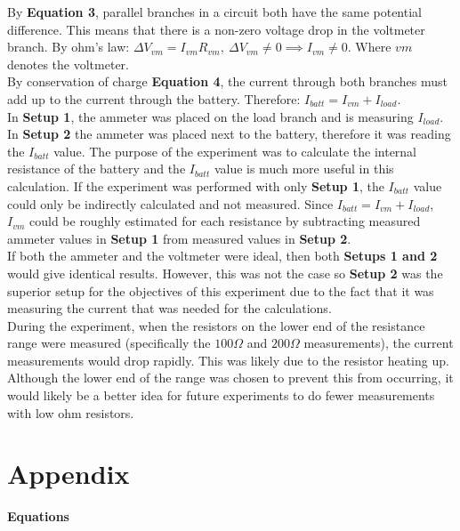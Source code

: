 \documentclass[
	letterpaper, %
	10pt, %
]{CSUniSchoolLabReport}
\begin{document}
By \textbf{Equation 3}, parallel branches in a circuit both have the same potential
difference. This means that there is a non-zero voltage drop in the voltmeter branch. By ohm's law:
$\Delta V_{vm} = I_{vm} R_{vm}, \ \Delta V_{vm} \ne 0 \implies I_{vm} \ne 0$. Where $vm$ denotes the voltmeter.\\

By conservation of charge \textbf{Equation 4}, the current through both branches must add up to the current through the battery. Therefore: $I_{batt} = I_{vm} + I_{load}$.\\

In \textbf{Setup 1}, the ammeter was placed on the load branch and is measuring $I_{load}$. In \textbf{Setup 2} the
ammeter was placed next to the battery, therefore it was reading the $I_{batt}$ value. The
purpose of the experiment was to calculate the internal resistance of the battery and the $I_{batt}$ value is much more useful in this
calculation. If the experiment was performed with only \textbf{Setup 1}, the $I_{batt}$ value could only be indirectly calculated and
not measured. Since $I_{batt} = I_{vm} +I_{load}$, $I_{vm}$ could be roughly estimated for each resistance by
subtracting measured ammeter values in \textbf{Setup 1} from measured values in \textbf{Setup 2}.   \\

If both the ammeter and the voltmeter were ideal, then both \textbf{Setups 1 and 2} would give identical
results. However, this was not the case so \textbf{Setup 2} was the superior setup for the objectives of this
experiment due to the fact that it was measuring the current that was needed for the calculations.\\

During the experiment, when the resistors on the lower end of the resistance range were measured
(specifically the $100\Omega$ and $200\Omega$ measurements), the current measurements would drop rapidly. This was likely
due to the resistor heating up. Although the lower end of the range was chosen to prevent this from
occurring, it would likely be a better idea for future experiments to do fewer measurements with low ohm resistors.

\section{Appendix}

{\large\textbf{Equations}}\\
\end{document}
